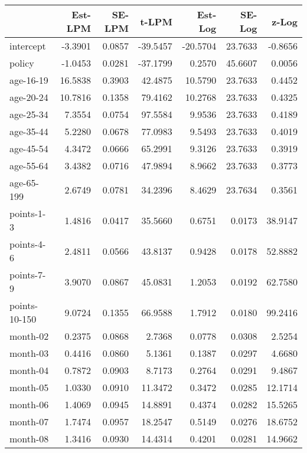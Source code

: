 \documentclass[10pt]{article}
\begin{document}

\begin{table}[ht]
\centering
\begin{tabular}{lrrrrrr}
  \hline
 & Est-LPM & SE-LPM & t-LPM & Est-Log & SE-Log & z-Log \\ 
  \hline
intercept & -3.3901 & 0.0857 & -39.5457 & -20.5704 & 23.7633 & -0.8656 \\ 
  policy & -1.0453 & 0.0281 & -37.1799 & 0.2570 & 45.6607 & 0.0056 \\ 
  age-16-19 & 16.5838 & 0.3903 & 42.4875 & 10.5790 & 23.7633 & 0.4452 \\ 
  age-20-24 & 10.7816 & 0.1358 & 79.4162 & 10.2768 & 23.7633 & 0.4325 \\ 
  age-25-34 & 7.3554 & 0.0754 & 97.5584 & 9.9536 & 23.7633 & 0.4189 \\ 
  age-35-44 & 5.2280 & 0.0678 & 77.0983 & 9.5493 & 23.7633 & 0.4019 \\ 
  age-45-54 & 4.3472 & 0.0666 & 65.2991 & 9.3126 & 23.7633 & 0.3919 \\ 
  age-55-64 & 3.4382 & 0.0716 & 47.9894 & 8.9662 & 23.7633 & 0.3773 \\ 
  age-65-199 & 2.6749 & 0.0781 & 34.2396 & 8.4629 & 23.7634 & 0.3561 \\ 
  points-1-3 & 1.4816 & 0.0417 & 35.5660 & 0.6751 & 0.0173 & 38.9147 \\ 
  points-4-6 & 2.4811 & 0.0566 & 43.8137 & 0.9428 & 0.0178 & 52.8882 \\ 
  points-7-9 & 3.9070 & 0.0867 & 45.0831 & 1.2053 & 0.0192 & 62.7580 \\ 
  points-10-150 & 9.0724 & 0.1355 & 66.9588 & 1.7912 & 0.0180 & 99.2416 \\ 
  month-02 & 0.2375 & 0.0868 & 2.7368 & 0.0778 & 0.0308 & 2.5254 \\ 
  month-03 & 0.4416 & 0.0860 & 5.1361 & 0.1387 & 0.0297 & 4.6680 \\ 
  month-04 & 0.7872 & 0.0903 & 8.7173 & 0.2764 & 0.0291 & 9.4867 \\ 
  month-05 & 1.0330 & 0.0910 & 11.3472 & 0.3472 & 0.0285 & 12.1714 \\ 
  month-06 & 1.4069 & 0.0945 & 14.8891 & 0.4374 & 0.0282 & 15.5265 \\ 
  month-07 & 1.7474 & 0.0957 & 18.2547 & 0.5149 & 0.0276 & 18.6752 \\ 
  month-08 & 1.3416 & 0.0930 & 14.4314 & 0.4201 & 0.0281 & 14.9662 \\ 

\end{tabular}
\end{table}
\end{document}
